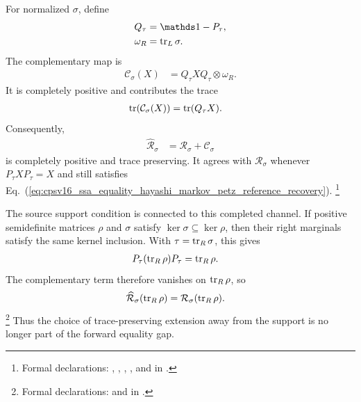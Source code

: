 \documentclass[11pt]{article}
\begin{document}
For normalized $\sigma$, define
\begin{align}
    Q_\tau
        &=\Id-P_\tau,
    \label{eq:cpsv16_ssa_equality_hayashi_markov_support_complement}\\
    \omega_R
        &=\tr_L\sigma.
    \label{eq:cpsv16_ssa_equality_hayashi_markov_reference_right_marginal}
\end{align}
The complementary map is
\begin{align}
    \mathcal C_\sigma(X)
        &=Q_\tau XQ_\tau\otimes\omega_R.
    \label{eq:cpsv16_ssa_equality_hayashi_markov_petz_complement}
\end{align}
It is completely positive and contributes the trace
\begin{align}
    \operatorname{tr}\!\left(\mathcal C_\sigma(X)\right)
        &=\operatorname{tr}(Q_\tau X).
    \label{eq:cpsv16_ssa_equality_hayashi_markov_complement_trace}
\end{align}
Consequently,
\begin{align}
    \widehat{\mathcal R}_\sigma
        &=\mathcal R_\sigma+\mathcal C_\sigma
    \label{eq:cpsv16_ssa_equality_hayashi_markov_completed_petz_channel}
\end{align}
is completely positive and trace preserving. It agrees with
$\mathcal R_\sigma$ whenever $P_\tau XP_\tau=X$ and still satisfies
Eq.~(\ref{eq:cpsv16_ssa_equality_hayashi_markov_petz_reference_recovery}).%
\footnote{Formal declarations:
,
,
,
, and
 in
.}

The source support condition is connected to this completed channel. If
positive semidefinite matrices $\rho$ and $\sigma$ satisfy
$\ker\sigma\subseteq\ker\rho$, then their right marginals satisfy the same
kernel inclusion. With $\tau=\operatorname{tr}_R\sigma$, this gives
\begin{align}
    P_\tau(\operatorname{tr}_R\rho)P_\tau
        &=\operatorname{tr}_R\rho.
    \label{eq:cpsv16_ssa_equality_hayashi_markov_marginal_support}
\end{align}
The complementary term therefore vanishes on $\operatorname{tr}_R\rho$, so
\begin{align}
    \widehat{\mathcal R}_\sigma(\operatorname{tr}_R\rho)
        &=\mathcal R_\sigma(\operatorname{tr}_R\rho).
    \label{eq:cpsv16_ssa_equality_hayashi_markov_completed_raw_agreement}
\end{align}
\footnote{Formal declarations:
and
in .}
Thus the choice of trace-preserving extension away from the support is no
longer part of the forward equality gap.
\end{document}
